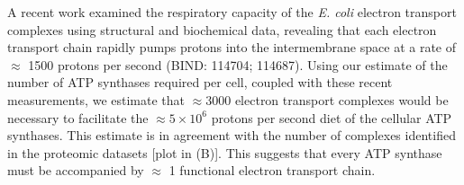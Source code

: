 A recent work \citep{szenk2017} examined the respiratory capacity of the \textit{E. coli}
electron transport complexes using structural and biochemical data, revealing
that each electron transport chain rapidly pumps protons into the
intermembrane space at a rate of $\approx$ 1500 protons per second (BIND:
114704; 114687). Using our estimate of the number of ATP synthases required
per cell, coupled with these recent
measurements, we estimate that $\approx 3000$ electron transport complexes
would be necessary to facilitate the $\approx 5 \times 10^6$ protons per second
diet of the cellular ATP synthases. This estimate is in agreement with the
number of complexes identified in the proteomic datasets [plot in
(B)]. This suggests that every ATP synthase must be
accompanied by $\approx$ 1 functional electron transport chain.

%


